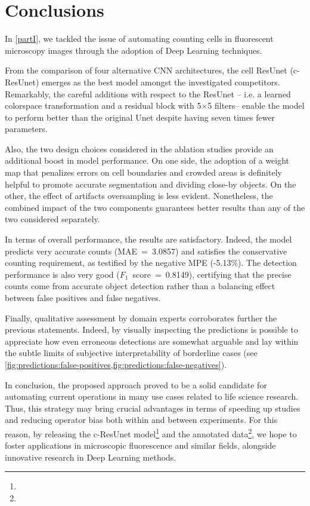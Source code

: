\chapter{Conclusions}
\label{chap:partI_conclusions}
In \cref{partI}, we tackled the issue of automating counting cells in fluorescent microscopy images through the adoption of Deep Learning techniques.

From the comparison of four alternative CNN architectures, the cell ResUnet (c-ResUnet) emerges as the best model amongst the investigated competitors.
Remarkably, the careful additions with respect to the ResUnet \cite{deep_resunet} -- i.e. a learned colorspace transformation and a residual block with 5$\times$5 filters-- enable the model to perform better than the original Unet \cite{unet} despite having seven times fewer parameters.

Also, the two design choices considered in the ablation studies provide an additional boost in model performance. 
On one side, the adoption of a weight map that penalizes errors on cell boundaries and crowded areas is definitely helpful to promote accurate segmentation and dividing close-by objects. 
On the other, the effect of artifacts oversampling is less evident.
Nonetheless, the combined impact of the two components guarantees better results than any of the two considered separately.

In terms of overall performance, the results are satisfactory. 
Indeed, the model predicts very accurate counts (\mbox{MAE = 3.0857}) and satisfies the conservative counting requirement, as testified by the negative MPE (-5.13\%).
The detection performance is also very good (\mbox{$F_1$ score = 0.8149}), certifying that the precise counts come from accurate object detection rather than a balancing effect between false positives and false negatives.

Finally, qualitative assessment by domain experts corroborates further the previous statements. 
Indeed, by visually inspecting the predictions is possible to appreciate how even erroneous detections are somewhat arguable and lay within the subtle limits of subjective interpretability of borderline cases (see \cref{fig:predictions:false-positives,fig:predictions:false-negatives}).


In conclusion, the proposed approach proved to be a solid candidate for automating current operations in many use cases related to life science research.
Thus, this strategy may bring crucial advantages in terms of speeding up studies and reducing operator bias both within and between experiments.
For this reason, by releasing the c-ResUnet model\footnote{\linkmodel} and the annotated data\footnote{\dataset}, we hope to foster applications in microscopic fluorescence and similar fields, alongside innovative research in Deep Learning methods.